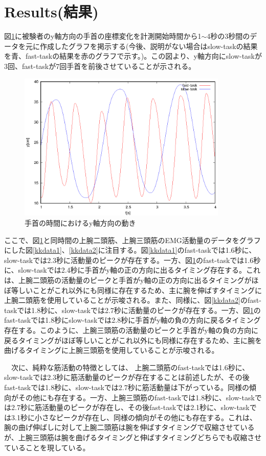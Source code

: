 \documentclass{jsarticle}
\begin{document}
\section{Results(結果)}
図\ref{tym3}に被験者のy軸方向の手首の座標変化を計測開始時間から1$\sim$4秒の3秒間のデータを元に作成したグラフを掲示する(今後、説明がない場合はslow-taskの結果を青、fast-taskの結果を赤のグラフで示す。)。この図より、y軸方向にslow-taskが3回、fast-taskが7回手首を前後させていることが示される。


\begin{figure}[htb]
  \begin{center}
    \includegraphics[width=10cm]{tym3.eps}
    \caption{手首の時間におけるy軸方向の動き}
    \label{tym3}
  \end{center}
\end{figure}


ここで、図\ref{tym3}と同時間の上腕二頭筋、上腕三頭筋のEMG活動量のデータをグラフにした図\ref{kkdata1}、\ref{kkdata2}に注目する。図\ref{kkdata1}のfast-taskでは1.6秒に、slow-taskでは2.3秒に活動量のピークが存在する。一方、図\ref{tym3}のfast-taskでは1.6秒に、slow-taskでは2.4秒に手首がy軸の正の方向に出るタイミング存在する。これは、上腕二頭筋の活動量のピークと手首がy軸の正の方向に出るタイミングがほぼ等しいことがこれ以外にも同様に存在するため、主に腕を伸ばすタイミングに上腕二頭筋を使用していることが示唆される。また、同様に、図\ref{kkdata2}のfast-taskでは1.8秒に、slow-taskでは2.7秒に活動量のピークが存在する。一方、図\ref{tym3}のfast-taskでは1.8秒にslow-taskでは2.8秒に手首がy軸の負の方向に戻るタイミング存在する。このように、上腕三頭筋の活動量のピークと手首がy軸の負の方向に戻るタイミングがほぼ等しいことがこれ以外にも同様に存在するため、主に腕を曲げるタイミングに上腕三頭筋を使用していることが示唆される。

　次に、純粋な筋活動の特徴としては、
上腕二頭筋のfast-taskでは1.6秒に、slow-taskでは2.3秒に筋活動量のピークが存在することは前述したが、その後fast-taskでは1.8秒に、slow-taskでは2.7秒に筋活動量は下がっている。同様の傾向がその他にも存在する。一方、上腕三頭筋のfast-taskでは1.8秒に、slow-taskでは2.7秒に筋活動量のピークが存在し、その後fast-taskでは2.1秒に、slow-taskでは3.1秒に小さなピークが存在し、同様の傾向がその他にも存在する。これは、腕の曲げ伸ばしに対して上腕二頭筋は腕を伸ばすタイミングで収縮させているが、上腕三頭筋は腕を曲げるタイミングと伸ばすタイミングどちらでも収縮させていることを現している。
\end{document}
